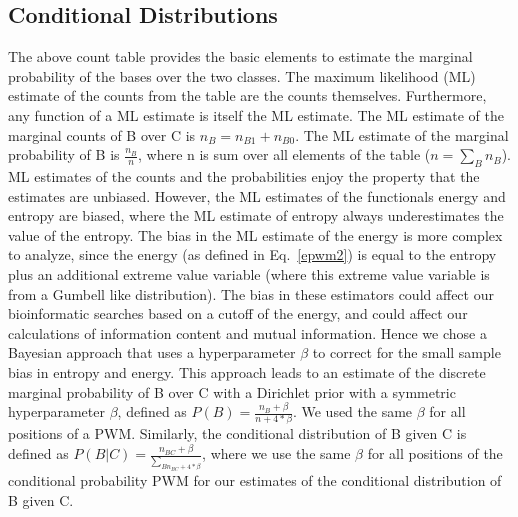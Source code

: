 \subsection{Conditional Distributions}\label{cdhyper}
The above count table provides the basic elements to estimate the marginal probability of the bases over the two classes.  The maximum likelihood (ML) estimate of the counts from the table are the counts themselves.  Furthermore, any function of a ML estimate is itself the ML estimate.  The ML estimate of the marginal counts of B over C is $n_{B}=n_{B1}+n_{B0}$.  The ML estimate of the marginal probability of B is $\frac{n_B}{n}$, where n is sum over all elements of the table ($n=\sum_B n_B$).  ML estimates of the counts and the probabilities enjoy the property that the estimates are unbiased.  However, the ML estimates of the functionals energy and entropy are biased, where the ML estimate of entropy always underestimates the value of the entropy\cite{Nemenman02entropyand}. The bias in the ML estimate of the energy is more complex to analyze, since the energy (as defined in Eq.~\ref{epwm2}) is equal to the entropy plus an additional extreme value variable (where this extreme value variable is from a Gumbell like distribution).  The bias in these estimators could affect our bioinformatic searches based on a cutoff of the energy, and could affect our calculations of information content and mutual information.  Hence we chose a Bayesian approach that uses a hyperparameter $\beta$ to correct for the small sample bias in entropy and energy.  This approach leads to an estimate of the discrete marginal probability of B over C with a Dirichlet prior with a symmetric hyperparameter $\beta$, defined as $P(B)=\frac{n_{B}+\beta}{n+4*\beta}$.  We used the same $\beta$ for all positions of a PWM\cite{MEP}.  Similarly, the conditional distribution of B given C is defined  as $P(B|C)=\frac{n_{BC}+\beta}{\sum_{B{n_{BC}}+4*\beta}}$, where we use the same $\beta$ for all positions of the conditional probability PWM for our estimates of the conditional distribution of B given C. 

